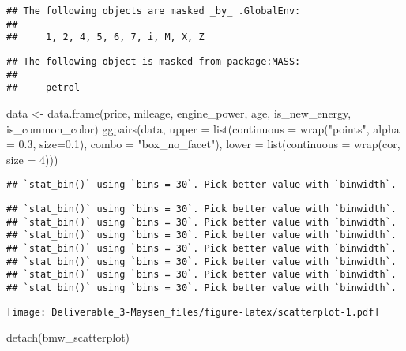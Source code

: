 \documentclass[
]{article}
\newenvironment{Shaded}{\begin{snugshade}}{\end{snugshade}}
\newcommand{\AttributeTok}[1]{\textcolor[rgb]{0.77,0.63,0.00}{#1}}
\newcommand{\DecValTok}[1]{\textcolor[rgb]{0.00,0.00,0.81}{#1}}
\newcommand{\FloatTok}[1]{\textcolor[rgb]{0.00,0.00,0.81}{#1}}
\newcommand{\FunctionTok}[1]{\textcolor[rgb]{0.00,0.00,0.00}{#1}}
\newcommand{\NormalTok}[1]{#1}
\newcommand{\OtherTok}[1]{\textcolor[rgb]{0.56,0.35,0.01}{#1}}
\newcommand{\StringTok}[1]{\textcolor[rgb]{0.31,0.60,0.02}{#1}}
\begin{document}
\begin{verbatim}
## The following objects are masked _by_ .GlobalEnv:
## 
##     1, 2, 4, 5, 6, 7, i, M, X, Z
\end{verbatim}

\begin{verbatim}
## The following object is masked from package:MASS:
## 
##     petrol
\end{verbatim}

\begin{Shaded}
\begin{Highlighting}[]
\NormalTok{data }\OtherTok{\textless{}{-}} \FunctionTok{data.frame}\NormalTok{(price, mileage, engine\_power, age, is\_new\_energy, is\_common\_color)}
\FunctionTok{ggpairs}\NormalTok{(data, }\AttributeTok{upper =} \FunctionTok{list}\NormalTok{(}\AttributeTok{continuous =} \FunctionTok{wrap}\NormalTok{(}\StringTok{"points"}\NormalTok{, }\AttributeTok{alpha =} \FloatTok{0.3}\NormalTok{, }\AttributeTok{size=}\FloatTok{0.1}\NormalTok{), }\AttributeTok{combo =} \StringTok{"box\_no\_facet"}\NormalTok{),}
        \AttributeTok{lower =} \FunctionTok{list}\NormalTok{(}\AttributeTok{continuous =} \FunctionTok{wrap}\NormalTok{(}\StringTok{\textquotesingle{}cor\textquotesingle{}}\NormalTok{, }\AttributeTok{size =} \DecValTok{4}\NormalTok{)))}
\end{Highlighting}
\end{Shaded}

\begin{verbatim}
## `stat_bin()` using `bins = 30`. Pick better value with `binwidth`.
\end{verbatim}

\begin{verbatim}
## `stat_bin()` using `bins = 30`. Pick better value with `binwidth`.
## `stat_bin()` using `bins = 30`. Pick better value with `binwidth`.
## `stat_bin()` using `bins = 30`. Pick better value with `binwidth`.
## `stat_bin()` using `bins = 30`. Pick better value with `binwidth`.
## `stat_bin()` using `bins = 30`. Pick better value with `binwidth`.
## `stat_bin()` using `bins = 30`. Pick better value with `binwidth`.
## `stat_bin()` using `bins = 30`. Pick better value with `binwidth`.
\end{verbatim}

\texttt{[image: Deliverable\_3-Maysen\_files/figure-latex/scatterplot-1.pdf]}

\begin{Shaded}
\begin{Highlighting}[]
\FunctionTok{detach}\NormalTok{(bmw\_scatterplot)}
\end{Highlighting}
\end{Shaded}
\end{document}
